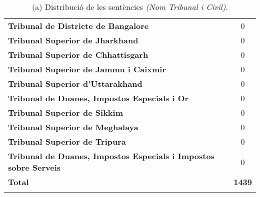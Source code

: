 \begin{table}[H]
\begin{tabular}{|l|c}
        \textbf{Tribunal de Districte de Bangalore} & 0 \\
        \textbf{Tribunal Superior de Jharkhand} & 0 \\
        \textbf{Tribunal Superior de Chhattisgarh} & 0 \\
        \textbf{Tribunal Superior de Jammu i Caixmir} & 0 \\
        \textbf{Tribunal Superior d'Uttarakhand} & 0 \\
        \textbf{Tribunal de Duanes, Impostos Especials i Or} & 0 \\
        \textbf{Tribunal Superior de Sikkim} & 0 \\
        \textbf{Tribunal Superior de Meghalaya} & 0 \\
        \textbf{Tribunal Superior de Tripura} & 0 \\
        \textbf{Tribunal de Duanes, Impostos Especials i Impostos sobre Serveis} & 0 \\
        \hline
        \textbf{Total} & \textbf{1439} \\
        \Xhline{2\arrayrulewidth}
   \end{tabular}
   \captionsetup{font=small}
   \caption*{(a) Distribució de les sentències \textit{(Nom Tribunal i Civil)}.}
\end{table}

\pagebreak
  
